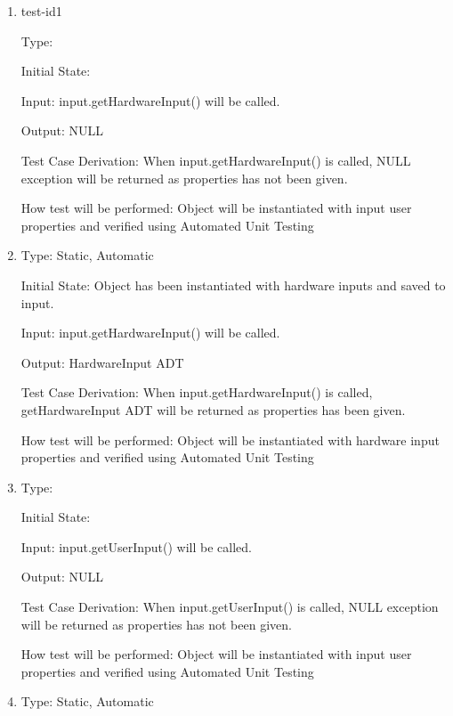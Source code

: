 \documentclass[12pt, titlepage]{article}
\begin{document}
\begin{enumerate}[{UT-IC}1.]

\item{test-id1\\}

Type: 
					
Initial State: 
					
Input: input.getHardwareInput() will be called.
					
Output: NULL

Test Case Derivation: When input.getHardwareInput() is called, NULL exception will be returned as properties has not been given.

How test will be performed: Object will be instantiated with input user properties and verified using Automated Unit Testing

\item

Type: Static, Automatic
					
Initial State: Object has been instantiated with hardware inputs and saved to input.
					
Input: input.getHardwareInput() will be called.
					
Output: HardwareInput ADT

Test Case Derivation: When input.getHardwareInput() is called, getHardwareInput ADT will be returned as properties has been given.


How test will be performed: Object will be instantiated with hardware input properties and verified using Automated Unit Testing 

\item

Type: 
					
Initial State: 
					
Input: input.getUserInput() will be called.
					
Output: NULL

Test Case Derivation: When input.getUserInput() is called, NULL exception will be returned as properties has not been given.

How test will be performed: Object will be instantiated with input user properties and verified using Automated Unit Testing

\item

Type: Static, Automatic
					

\end{enumerate}
\end{document}
